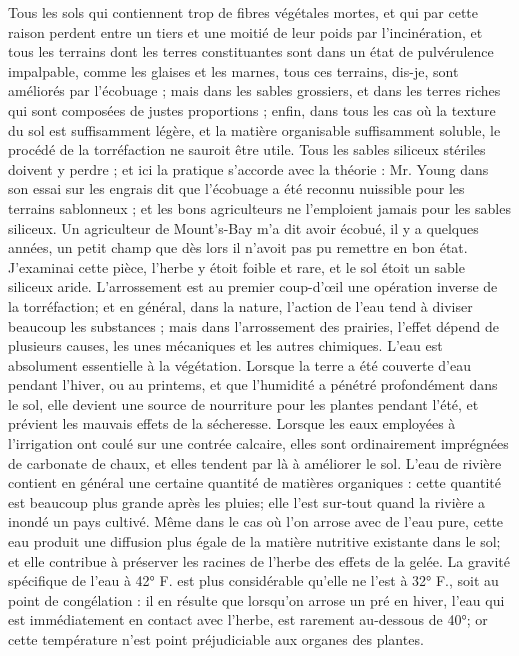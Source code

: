 Tous les sols qui contiennent trop de fibres végétales mortes, et qui par cette raison perdent entre un tiers et une moitié de leur poids par l'incinération, et tous les terrains dont les terres constituantes sont dans un état de pulvérulence impalpable, comme les glaises et les marnes, tous ces terrains, dis-je, sont améliorés par l'écobuage ; mais dans les sables grossiers, et dans les terres riches qui sont composées de justes proportions ; enfin, dans tous les cas où la texture du sol est suffisamment légère, et la matière\setcounter{page}{277} organisable suffisamment soluble, le procédé de la torréfaction ne sauroit être utile.
Tous les sables siliceux stériles doivent y perdre ; et ici la pratique s'accorde avec la théorie : Mr. Young dans son essai sur les engrais dit que l'écobuage a été reconnu nuissible pour les terrains sablonneux ; et les bons agriculteurs ne l'emploient jamais pour les sables siliceux. Un agriculteur de Mount's-Bay m'a dit avoir écobué, il y a quelques années, un petit champ que dès lors il n'avoit pas pu remettre en bon état. J'examinai cette pièce, l'herbe y étoit foible et rare, et le sol étoit un sable siliceux aride.
L'arrossement est au premier coup-d'œil une opération inverse de la torréfaction; et en général, dans la nature, l'action de l'eau tend à diviser beaucoup les substances ; mais dans l'arrossement des prairies, l'effet dépend de plusieurs causes, les unes mécaniques et les autres chimiques.
L'eau est absolument essentielle à la végétation. Lorsque la terre a été couverte d'eau pendant l'hiver, ou au printems, et que l'humidité a pénétré profondément dans le sol, elle devient une source de nourriture pour les plantes pendant l'été, et prévient les mauvais effets de la sécheresse.
Lorsque les eaux employées à l'irrigation\setcounter{page}{278} ont coulé sur une contrée calcaire, elles sont ordinairement imprégnées de carbonate de chaux, et elles tendent par là à améliorer le sol.
L'eau de rivière contient en général une certaine quantité de matières organiques : cette quantité est beaucoup plus grande après les pluies; elle l'est sur-tout quand la rivière a inondé un pays cultivé.
Même dans le cas où l'on arrose avec de l'eau pure, cette eau produit une diffusion plus égale de la matière nutritive existante dans le sol; et elle contribue à préserver les racines de l'herbe des effets de la gelée.
La gravité spécifique de l'eau à 42° F. est plus considérable qu'elle ne l'est à 32° F., soit au point de congélation : il en résulte que lorsqu'on arrose un pré en hiver, l'eau qui est immédiatement en contact avec l'herbe, est rarement au-dessous de 40°; or cette température n'est point préjudiciable aux organes des plantes.
